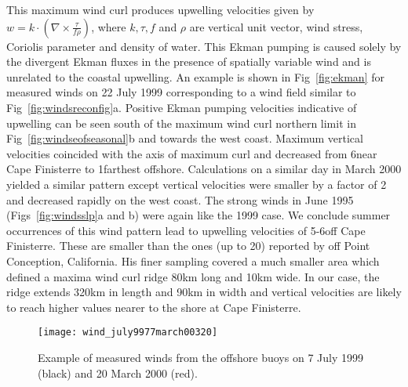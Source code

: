 This maximum wind curl produces upwelling velocities given by
\(w=k\cdot(\nabla \times \frac{\tau}{f\rho} )\), where $k,\tau,f$
and $\rho$ are vertical unit vector, wind stress, Coriolis
parameter and density of water. This Ekman pumping is caused
solely by the divergent Ekman fluxes in the presence of spatially
variable wind and is unrelated to the coastal upwelling.  An
example is shown in Fig~\ref{fig:ekman} for measured winds on 22
July 1999 corresponding to a wind field similar to
Fig~\ref{fig:windsreconfig}a. Positive Ekman pumping velocities
indicative of upwelling can be seen south of the maximum wind curl
northern limit in Fig~\ref{fig:windseofseasonal}b and towards the
west coast. Maximum vertical velocities coincided with the axis of
maximum curl and decreased from 6\veld near Cape Finisterre to
1\veld farthest offshore. Calculations on a similar day in March
2000 yielded a similar pattern except vertical velocities were
smaller by a factor of 2 and decreased rapidly on the west coast.
The strong winds in June 1995 (Figs~\ref{fig:windsslp}a and b)
were again like the 1999 case. We conclude summer occurrences of
this wind pattern lead to upwelling velocities of 5-6\veld off
Cape Finisterre. These are smaller than the ones (up to 20\veld)
reported by \nocite{munchow00}
off Point Conception, California. His finer sampling covered a
much smaller area which defined a maxima wind curl ridge 80km long
and 10km wide. In our case, the ridge extends 320km in length and
90km in width and vertical velocities are likely to reach higher
values nearer to the shore at Cape Finisterre.
\begin{figure}
\centering
\texttt{[image: wind\_july9977march00320]}
\caption{Example of measured winds from the offshore buoys on 7
July 1999 (black) and 20 March 2000 (red).} \label{fig:rev}
\end{figure}

